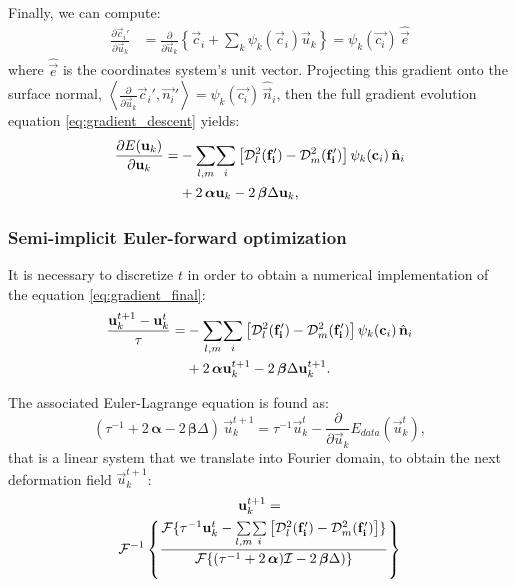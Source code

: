 Finally, we can compute:
\begin{align}
\frac{\partial \vec{c}_i'}{\partial \vec{u}_k} &= \frac{\partial}{\partial \vec{u}_k}
\left\{ \vec{c}_i + \sum_k \psi_k(\vec{c}_i) \vec{u}_k \right\}
= \psi_k(\vec{c_i})\, \hat{\vec{e}}
\end{align}
where $\hat{\vec{e}}$ is the coordinates system's unit vector.
Projecting this gradient onto the surface normal,
$\left\langle \frac{\partial}{\partial \vec{u}_k}{\vec{c}_i}', \vec{n_i}'\right\rangle
= \psi_k(\vec{c_i})\, \hat{\vec{n}}_i$, then the
full gradient evolution equation \eqref{eq:gradient_descent} yields:
\begin{align}
\frac{\partial E(\vec{u}_k)}{\partial \vec{u}_k} =
&- \underset{l,m}{\sum} \underset{i}{\sum}
\left[ \mdist{f_i'}{l} - \mdist{f_i'}{m} \right]
\psi_k(\vec{c}_i)\, \hat{\vec{n}}_i \notag\\
&+2\, \boldsymbol{\alpha} \vec{u}_k
-2\, \boldsymbol{\beta} \Delta \vec{u}_k,
\label{eq:gradient_final}
\end{align}

\subsubsection{Semi-implicit Euler-forward optimization}
It is necessary to discretize $t$ in order to obtain a numerical
implementation of the equation \eqref{eq:gradient_final}:
\begin{align}
\frac{\vec{u}_k^{t+1}-\vec{u}_k^t}{\tau} =
&- \underset{l,m}{\sum} \underset{i}{\sum}
\left[ \mdist{f_i'}{l} - \mdist{f_i'}{m}\right]
\psi_k(\vec{c}_i)\, \hat{\vec{n}}_i \notag\\
&+2\, \boldsymbol{\alpha} \vec{u}_k^{t+1}
-2\, \boldsymbol{\beta} \Delta \vec{u}_k^{t+1}.
\end{align}

The associated Euler-Lagrange equation is found as:
\begin{equation}
(\tau^{-1} +2\, \boldsymbol{\alpha} - 2\, \boldsymbol{\beta} \Delta )\, \vec{u}_k^{t+1} =
\tau^{-1} \vec{u}_k^t - \frac{\partial}{\partial \vec{u}_k} E_{data}(\vec{u}_k^t),
\end{equation}
that is a linear system that we translate into Fourier domain,
to obtain the next deformation field $\vec{u}_k^{t+1}$:
\begin{multline}
\vec{u}_k^{t+1} = \\
 \mathcal{F}^{-1} \left\lbrace
\frac{\mathcal{F}\lbrace \tau^{-1}\vec{u}_{k}^{t} - \underset{l,m}{\sum} \underset{i}{\sum}
\left[ \mdist{f_i'}{l} - \mdist{f_i'}{m}\right] \rbrace}
     {\mathcal{F}\lbrace (\tau^{-1} +2\,\boldsymbol{\alpha})\mathcal{I} - 2\,\boldsymbol{\beta} \Delta ) \rbrace}
     \right\rbrace
\end{multline}


